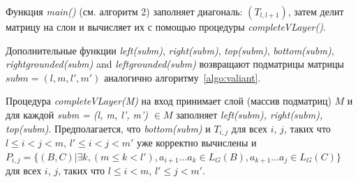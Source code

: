 \documentclass[14pt]{matmex-diploma-custom}
\begin{document}
Функция \textit{main()} (см. алгоритм 2) заполняет диагональ:  $(T_{l, l+1})$, затем делит матрицу на слои и вычисляет их с помощью процедуры \textit{completeVLayer()}.

Дополнительные функции \textit{left(subm)}, \textit{right(subm)}, \textit{top(subm)}, \textit{bottom(subm)}, \textit{rightgrounded(subm)} and \textit{leftgrounded(subm)} возвращают подматрицы матрицы $\textit{subm} = (l, m, l', m')$ аналогично алгоритму~\ref{algo:valiant}.

Процедура \textit{completeVLayer(M)} на вход принимает слой (массив подматриц)  $M$ и для каждой \textit{subm = (l, m, l', m') $\in M$} заполняет \textit{left(subm), right(subm), top(subm)}.
Предполагается, что \textit{bottom(subm)} и $T_{i, j}$ для всех $i$, $j$, таких что $l \leq i < j < m$, $  l' \leq i < j < m'$ уже корректно вычислены и 
$P_{i, j} =  \{ (B, C) | \exists k, (m \le k < l'), a_{i + 1} \dots a_{k} \in L_G(B), a_{k + 1} \dots a_{j} \in L_G(C)\} $ для всех $i$, $j$, таких что $l \leq i < m$, $l' \leq j < m'$.
\end{document}
